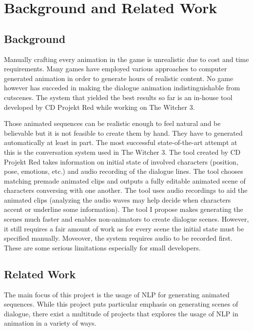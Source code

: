 \chapter{Background and Related Work \label{chap:background}}

\section{Background}
Manually crafting every animation in the game is unrealistic due to cost and time requirements. Many games have employed various approaches to computer generated animation in order to generate hours of realistic content. No game however has succeded in making the dialogue animation indistinguishable from cutscenes. The system that yielded the best results so far is an in-house tool developed by CD Projekt Red while working on The Witcher 3.

Those animated sequences can be realistic enough to feel natural and be believable but it is not feasible to create them by hand. They have to generated automatically at least in part. The most successful state-of-the-art attempt at this is the conversation system used in The Witcher 3. The tool created by CD Projekt Red takes information on initial state of involved characters (position, pose, emotions, etc.) and audio recording of the dialogue lines. The tool chooses matching premade animated clips and outputs a fully editable animated scene of characters conversing with one another. The tool uses audio recordings to aid the animated clips (analyzing the audio waves may help decide when characters accent or underline some information).
The tool I propose makes generating the scenes much faster and enables non-animators to create dialogue scenes. However, it still requires a fair amount of work as for every scene the initial state must be specified manually. Moveover, the system requires audio to be recorded first. These are some serious limitations especially for small developers. ~\cite{gdcwitcher}

\section{Related Work}
The main focus of this project is the usage of NLP for generating animated sequences. While this project puts particular emphasis on generating scenes of dialogue, there exist a multitude of projects that explores the usage of NLP in animation in a variety of ways.

